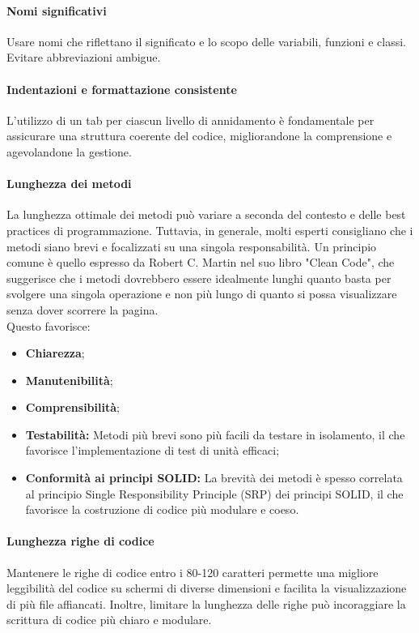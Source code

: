 \paragraph*{Nomi significativi} 
Usare nomi che riflettano il significato e lo scopo delle variabili, funzioni e classi. Evitare abbreviazioni ambigue.
\paragraph*{Indentazioni e formattazione consistente}
L'utilizzo di un tab per ciascun livello di annidamento è fondamentale per assicurare una struttura coerente del codice, migliorandone la comprensione e agevolandone la gestione.
\paragraph*{Lunghezza dei metodi}
La lunghezza ottimale dei metodi può variare a seconda del contesto e delle best practices di programmazione. Tuttavia, in generale, molti esperti consigliano che i metodi siano brevi e focalizzati su una singola responsabilità.
Un principio comune è quello espresso da Robert C. Martin nel suo libro "Clean Code", che suggerisce che i metodi dovrebbero essere idealmente lunghi quanto basta per svolgere una singola operazione e non più lungo di quanto si possa visualizzare senza dover scorrere la pagina. \\
Questo favorisce:
\begin{itemize}
    \item \textbf{Chiarezza};
    \item \textbf{Manutenibilità};
    \item \textbf{Comprensibilità};
    \item \textbf{Testabilità:} Metodi più brevi sono più facili da testare in isolamento, il che favorisce l'implementazione di test di unità efficaci;
    \item \textbf{Conformità ai principi SOLID:} La brevità dei metodi è spesso correlata al principio Single Responsibility Principle (SRP) dei principi SOLID, il che favorisce la costruzione di codice più modulare e coeso.
\end{itemize} 

\paragraph*{Lunghezza righe di codice}
Mantenere le righe di codice entro i 80-120 caratteri permette una migliore leggibilità del codice su schermi di diverse dimensioni e facilita la visualizzazione di più file affiancati.
Inoltre, limitare la lunghezza delle righe può incoraggiare la scrittura di codice più chiaro e modulare.
